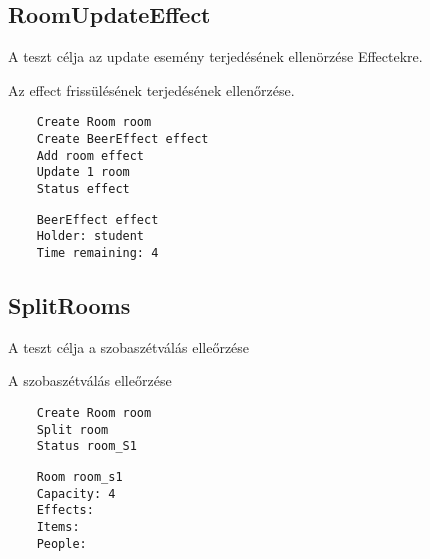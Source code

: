 \subsection{RoomUpdateEffect}
\begin{test-case-description}
    A teszt célja az update esemény terjedésének ellenörzése Effectekre.
\end{test-case-description}
\begin{test-case-function}
    Az effect frissülésének terjedésének ellenőrzése.
\end{test-case-function}
\begin{test-case-input}
    \begin{verbatim}
    Create Room room
    Create BeerEffect effect
    Add room effect
    Update 1 room
    Status effect
    \end{verbatim}
\end{test-case-input}
\begin{test-case-output}
    \begin{verbatim}
    BeerEffect effect
    Holder: student 
    Time remaining: 4
    \end{verbatim}
\end{test-case-output}

\subsection{SplitRooms}
\begin{test-case-description}
    A teszt célja a szobaszétválás elleőrzése
\end{test-case-description}
\begin{test-case-function}
    A szobaszétválás elleőrzése
\end{test-case-function}
\begin{test-case-input}
    \begin{verbatim}
    Create Room room
    Split room
    Status room_S1
    \end{verbatim}
\end{test-case-input}
\begin{test-case-output}
    \begin{verbatim}
    Room room_s1
    Capacity: 4
    Effects:
    Items: 
    People:
    \end{verbatim}
\end{test-case-output}

